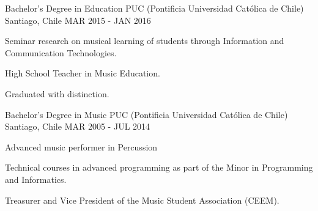 

\begin{cventries}

  \cventry
    {Bachelor's Degree in Education} %
    {PUC (Pontificia Universidad Católica de Chile)} %
    {Santiago, Chile} %
    {MAR 2015 - JAN 2016} %
    {
      \begin{cvitems} %
        \item {Seminar research on musical learning of students through Information and Communication Technologies.}
        \item {High School Teacher in Music Education.}
        \item {Graduated with distinction.}
      \end{cvitems}
    }

  \cventry
    {Bachelor's Degree in Music} %
    {PUC (Pontificia Universidad Católica de Chile)} %
    {Santiago, Chile} %
    {MAR 2005 - JUL 2014} %
    {
	    \begin{cvitems} %
	     	\item {Advanced music performer in Percussion}
	     	\item {Technical courses in advanced programming as part of the Minor in Programming and Informatics.}
	     	\item {Treasurer and Vice President of the Music Student Association (CEEM).}
	    \end{cvitems}
    }

\end{cventries}
